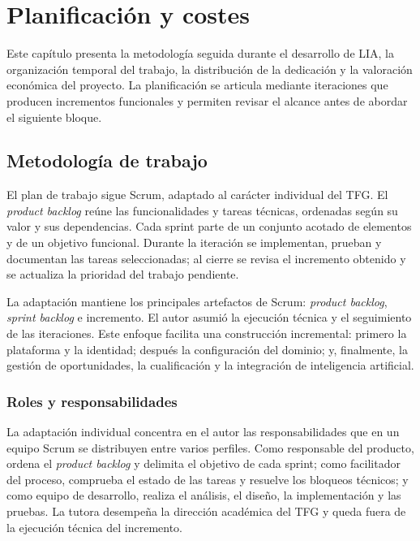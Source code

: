 \chapter{Planificación y costes}
\label{chap:planning}

Este capítulo presenta la metodología seguida durante el desarrollo de LIA,
la organización temporal del trabajo, la distribución de la dedicación y la
valoración económica del proyecto. La planificación se articula mediante
iteraciones que producen incrementos funcionales y permiten revisar el alcance
antes de abordar el siguiente bloque.

\section{Metodología de trabajo}

El plan de trabajo sigue Scrum, adaptado al carácter individual del TFG. El
\emph{product backlog} reúne las funcionalidades y tareas técnicas, ordenadas
según su valor y sus dependencias. Cada sprint parte de un conjunto acotado de
elementos y de un objetivo funcional. Durante la iteración se implementan,
prueban y documentan las tareas seleccionadas; al cierre se revisa el incremento
obtenido y se actualiza la prioridad del trabajo pendiente.

La adaptación mantiene los principales artefactos de Scrum: \emph{product
backlog}, \emph{sprint backlog} e incremento. El autor asumió la ejecución
técnica y el seguimiento de las iteraciones. Este enfoque facilita una
construcción incremental: primero la plataforma y la identidad; después la
configuración del dominio; y, finalmente, la gestión de oportunidades, la
cualificación y la integración de inteligencia artificial.

\subsection{Roles y responsabilidades}

La adaptación individual concentra en el autor las responsabilidades que en un
equipo Scrum se distribuyen entre varios perfiles. Como responsable del
producto, ordena el \emph{product backlog} y delimita el objetivo de cada
sprint; como facilitador del proceso, comprueba el estado de las tareas y
resuelve los bloqueos técnicos; y como equipo de desarrollo, realiza el
análisis, el diseño, la implementación y las pruebas. La tutora desempeña la
dirección académica del TFG y queda fuera de la ejecución técnica del
incremento.

